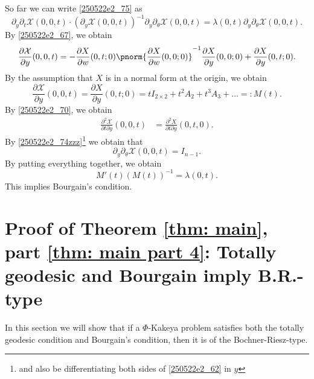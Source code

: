 \documentclass{article}
\numberwithin{equation}{section}
\theoremstyle{plain}
\begin{document}
So far we can write \eqref{250522e2_75} as 
\begin{equation}
\partial_y \partial_t \mathcal{X}(0, 0, t) \cdot
     (\partial_y \mathcal{X}(0, 0, t))^{-1} \partial_y\partial_\theta \mathcal{X}(0, 0, t) 
     =\lambda(0, t) \partial_y \partial_\theta \mathcal{X}(0, 0, t).
\end{equation}
By \eqref{250522e2_67}, we obtain 
\begin{multline}\label{250522e2_80}
\frac{\partial \mathcal{X}}{\partial y}(0, 0, t)=
-
\frac{\partial X}{\partial w}(0, t; 0)\pnorm{
\frac{\partial X}{\partial w}(0, 0; 0)
}^{-1} \frac{\partial X}{\partial y}(0, 0; 0)
+ 
\frac{\partial X}{\partial y}(0, t; 0).
\end{multline}
By the assumption that $X$ is in a normal form at the origin, we obtain 
\begin{equation}
\frac{\partial \mathcal{X}}{\partial y}(0, 0, t)=
\frac{\partial X}{\partial y}(0, t; 0)=
t I_{2\times 2}+ t^2 A_2+ t^3 A_3+\dots=: M(t).
\end{equation}
By \eqref{250522e2_70}, we obtain 
\begin{equation}\label{250522e2_82}
\begin{split}
\frac{\partial^2{\mathcal{X}}}{\partial t \partial y}(0, 0, t)
&=\frac{\partial^2 X}{\partial t\partial y}(0, t, 0).
\end{split}
\end{equation}
By \eqref{250522e2_74zzz}\footnote{and also be differentiating both sides of \eqref{250522e2_62} in $y$} we obtain that 
\begin{equation}
\partial_y \partial_\theta \mathcal{X}(0, 0, t)=I_{n-1}.
\end{equation}
By putting everything together, we obtain 
\begin{equation}
M'(t) (M(t))^{-1} = \lambda(0, t).
\end{equation}
This implies Bourgain's condition. 

\fi




\section{Proof of Theorem \ref{thm: main}, part \ref{thm: main part 4}: Totally geodesic and Bourgain imply B.R.-type}\label{251003secc6}




In this section we will show that if a $\Phi$-Kakeya problem satisfies both the totally geodesic condition and Bourgain's condition, then it is of the Bochner-Riesz-type. \\
\end{document}
